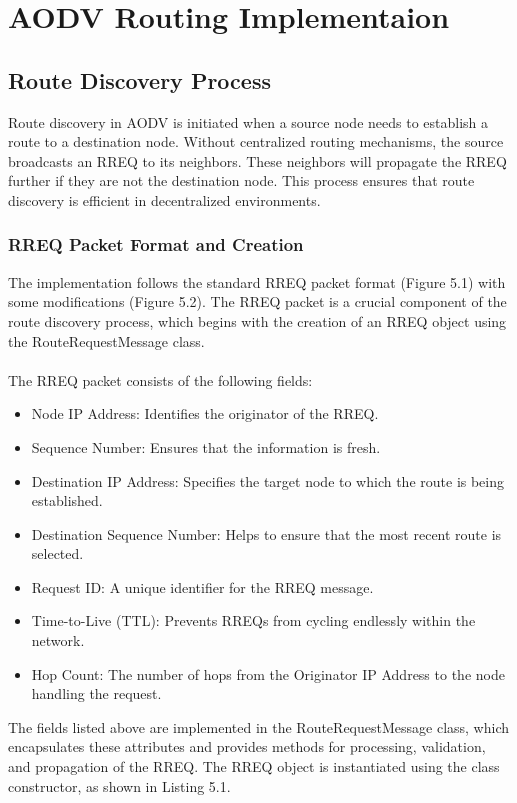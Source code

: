 \documentclass[]{nsm-thesis}
\begin{document}
\section{AODV Routing Implementaion}
\subsection{Route Discovery Process}
Route discovery in AODV is initiated when a source node needs to establish a route to a destination node. Without centralized routing mechanisms, the source broadcasts an RREQ to its neighbors. These neighbors will propagate the RREQ further if they are not the destination node. This process ensures that route discovery is efficient in decentralized environments.
\subsubsection{RREQ Packet Format and Creation}
The implementation follows the standard RREQ packet format (Figure 5.1) with some modifications (Figure 5.2). The RREQ packet is a crucial component of the route discovery process, which begins with the creation of an RREQ object using the RouteRequestMessage class.
\\
\\
The RREQ packet consists of the following fields:
\begin{itemize}
    \item Node IP Address: Identifies the originator of the RREQ.
    \item Sequence Number: Ensures that the information is fresh.
    \item Destination IP Address: Specifies the target node to which the route is being established.
    \item Destination Sequence Number: Helps to ensure that the most recent route is selected.
    \item Request ID: A unique identifier for the RREQ message.
    \item Time-to-Live (TTL): Prevents RREQs from cycling endlessly within the network.
    \item Hop Count: The number of hops from the Originator IP Address to the node handling the request.
\end{itemize}
The fields listed above are implemented in the RouteRequestMessage class, which encapsulates these attributes and provides methods for processing, validation, and propagation of the RREQ. The RREQ object is instantiated using the class constructor, as shown in Listing 5.1.
\end{document}
